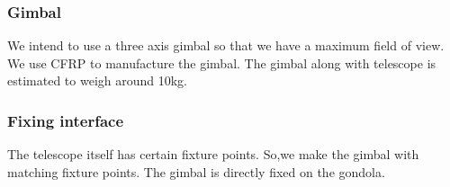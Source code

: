 \subsubsection{Gimbal}
\label {sec:4.4.3}
We intend to use a three axis gimbal so that we have a maximum field of view. We use CFRP to manufacture the gimbal. The gimbal along with telescope is estimated to weigh around 10kg.



\subsubsection{Fixing interface}
\label {sec:4.4.5}
The telescope itself has certain fixture points. So,we make the gimbal with matching fixture points. The gimbal is directly fixed on the gondola.